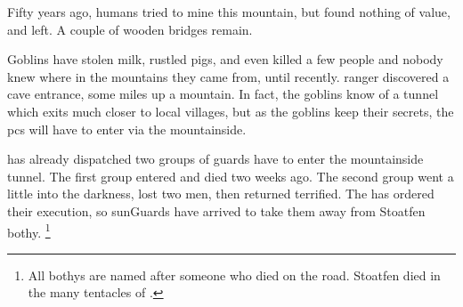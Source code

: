 \begin{multicols}{2}
\noindent
Fifty years ago, humans tried to mine this mountain, but found nothing of value, and left.
A couple of wooden bridges remain.

Goblins have stolen milk, rustled pigs, and even killed a few people and nobody knew where in the mountains they came from, until recently.
 ranger discovered a cave entrance, some miles up a mountain.
In fact, the goblins know of a tunnel which exits much closer to local \glspl{village}, but as the goblins keep their secrets, the \glspl{pc} will have to enter via the mountainside.

 has already dispatched two groups of \glspl{guard} have to enter the mountainside tunnel.
The first group entered and died two weeks ago.
The second group went a little into the darkness, lost two men, then returned terrified.
The  has ordered their execution, so \glspl{sunGuard} have arrived to take them away from Stoatfen \gls{bothy}.%
\footnote{All \glspl{bothy} are named after someone who died on the road.
Stoatfen died in the many tentacles of .}

\end{multicols}

